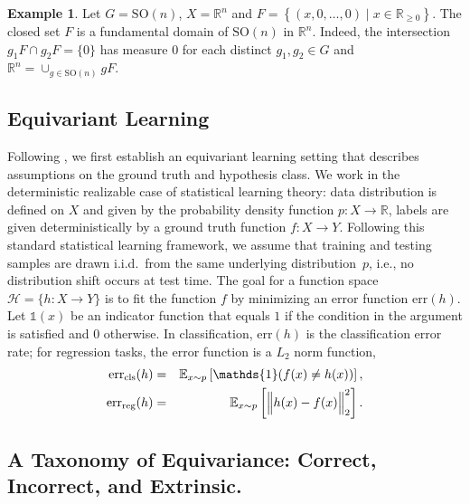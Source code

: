 \documentclass[10pt]{article} %
\newcommand{\R}{\mathbb{R}}
\theoremstyle{definition}
\newtheorem{example}{Example}
\begin{document}
\begin{example}
\label{example:fundamental_domain}
    Let $G = \mathrm{SO} (n)$, $X = \mathbb R ^n$ and $F = \left\{ (x, 0, \dots, 0) \mid x \in \R_{\geq 0} \right\}$.
    The closed set $F$ is a fundamental domain of $\mathrm{SO} (n)$ in $\R^n$. 
    Indeed, the intersection $g_1 F \cap g_2 F = \{ 0 \}$ has measure $0$ for each distinct $g_1, g_2 \in G$ and $\mathbb{R}^n = \cup_{g \in \mathrm{SO} (n)} g F$.
\end{example}


\subsection{Equivariant Learning}
\label{sec:summary} 

Following \cite{wang2024general}, we first establish an equivariant learning setting that describes assumptions on the ground truth and hypothesis class.
%
We work in the deterministic realizable case of statistical learning theory: 
data distribution is defined on $X$ and given by the probability density function $p \colon X \to \mathbb{R}$, labels are given deterministically by a ground truth function $f \colon X \to Y$. Following this standard statistical learning framework, we assume that training and testing samples are drawn i.i.d.\ from the same underlying distribution~$p$, i.e., no distribution shift occurs at test time.
The goal for a function space $\mathscr{H} = \{h \colon X \to Y \}$ is to fit the function $f$ by minimizing an error function $\text{err}(h)$. Let $\mathds{1}(x)$ be an indicator function that equals $1$ if the condition in the argument is satisfied and $0$ otherwise. In classification, $\text{err}(h)$ is the classification error rate; for regression tasks, the error function is a $L_2$ norm function,
\begin{eqnarray*}
 \text{err}_{\text{cls}}(h) &=& \mathbb{E}_{x \sim p}\left[\mathds{1}(f(x) \neq h(x))\right]    \label{eq:cls}, \\
 \text{err}_{\text{reg}}(h) &=& \mathbb{E}_{x \sim p}\left[\Bigl \lVert h(x) - f(x) \Bigr \rVert_2^2 \right]. \label{eq:reg}
\end{eqnarray*}
%
\subsection{A Taxonomy of Equivariance: Correct, Incorrect, and Extrinsic.}
\label{sec:equivariant_taxonomy}
\end{document}
